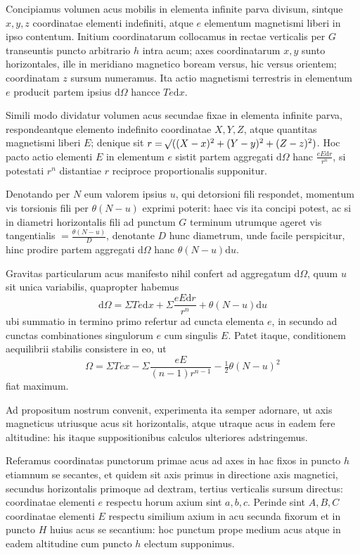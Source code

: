 Concipiamus volumen acus mobilis in elementa infinite parva divisum, sintque $x,y,z$ coordinatae elementi indefiniti, atque $e$ elementum magnetismi liberi in ipso contentum. Initium coordinatarum collocamus in rectae verticalis per $G$ transeuntis puncto arbitrario $h$ intra acum; axes coordinatarum $x,y$ sunto horizontales, ille in meridiano magnetico boream versus, hic versus orientem; coordinatam $z$ sursum numeramus. Ita actio magnetismi terrestris in elementum $e$ producit partem ipsius $\mathrm{d}\Omega$ hancce $Te\mathrm{d}x$.

Simili modo dividatur volumen acus secundae fixae in elementa infinite parva, respondeantque elemento indefinito coordinatae $X,Y,Z$, atque quantitas magnetismi liberi $E$; denique sit $r=\mathord{{}^{}\!\surd}((X-x)^2+(Y-y)^2+(Z-z)^2)$. Hoc pacto actio elementi $E$ in elementum $e$ sistit partem aggregati $\mathrm{d}\Omega$ hanc $\frac{eE\mathrm{d}r}{r^n}$, si potestati $r^n$ distantiae $r$ reciproce proportionalis supponitur.

Denotando per $N$ eum valorem ipsius $u$, qui detorsioni fili respondet, momentum vis torsionis fili per $\theta(N-u)$ exprimi poterit: haec vis ita concipi potest, ac si in diametri horizontalis fili ad punctum $G$ terminum utrumque ageret vis tangentialis $=\frac{\theta(N-u)}{D}$, denotante $D$ hunc diametrum, unde facile perspicitur, hinc prodire partem aggregati $\mathrm{d}\Omega$ hanc $\theta(N-u)\mathrm{d}u$.

Gravitas particularum acus manifesto nihil confert ad aggregatum $\mathrm{d}\Omega$, quum $u$ sit unica variabilis, quapropter habemus
\[
\mathrm{d}\Omega=\Sigma Te\mathrm{d}x+\Sigma\frac{eE\mathrm{d}r}{r^n}+\theta(N-u)\mathrm{d}u
\]
ubi summatio in termino primo refertur ad cuncta elementa $e$, in secundo ad cunctas combinationes singulorum $e$ cum singulis $E$. Patet itaque, conditionem aequilibrii stabilis consistere in eo, ut
\[
\Omega=\Sigma Tex-\Sigma\frac{eE}{(n-1)r^{n-1}}-\tfrac12\theta(N-u)^2
\]
fiat maximum.

Ad propositum nostrum convenit, experimenta ita semper adornare, ut axis magneticus utriusque acus sit horizontalis, atque utraque acus in eadem fere altitudine: his itaque suppositionibus calculos ulteriores adstringemus.

Referamus coordinatas punctorum primae acus ad axes in hac fixos in puncto $h$ etiamnum se secantes, et quidem sit axis primus in directione axis magnetici, secundus horizontalis primoque ad dextram, tertius verticalis sursum directus: coordinatae elementi $e$ respectu horum axium sint $a,b,c$. Perinde sint $A,B,C$ coordinatae elementi $E$ respectu similium axium in acu secunda fixorum et in puncto $H$ huius acus se secantium: hoc punctum prope medium acus atque in eadem altitudine cum puncto $h$ electum supponimus.

